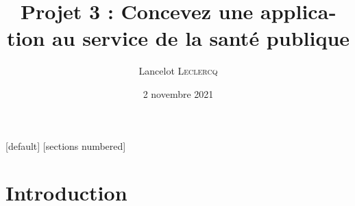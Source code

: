 
\usepackage{fontspec}
	\setmainfont{TeX Gyre Heros}
\usepackage{unicode-math}
\usepackage{lualatex-math}
\usepackage{polyglossia}
\setdefaultlanguage[frenchpart=false]{french}
\usepackage{microtype}
\usepackage[locale = FR,
            separate-uncertainty,
            multi-part-units = single,
            range-units = single]{siunitx}
	\DeclareSIUnit{}
\usepackage{amsmath}
\usepackage{amsfonts}
\usepackage{amssymb}
\usepackage{array}
\usepackage{graphicx}
\graphicspath{{./Figures/}}
\usepackage{booktabs}
\usepackage{tabularx}
\usepackage{multirow}
\usepackage{multicol}
\usepackage{tikz}
\usetikzlibrary{mindmap}
\usetikzlibrary{overlay-beamer-styles}
\usepackage{subcaption}
\usepackage[]{animate}
\usepackage{float}
\usepackage{csquotes}

[default]
[sections numbered]

\title[Concevez une application au service de la santé publique]{Projet 3 : Concevez une application au service de la santé publique}
\author[Lancelot \textsc{Leclercq}]{Lancelot \textsc{Leclercq}} 
\institute[]{}
\date[]{\small{2 novembre 2021}}



\begin{frame}[plain]
  \titlepage
\end{frame}

\section{Introduction}

